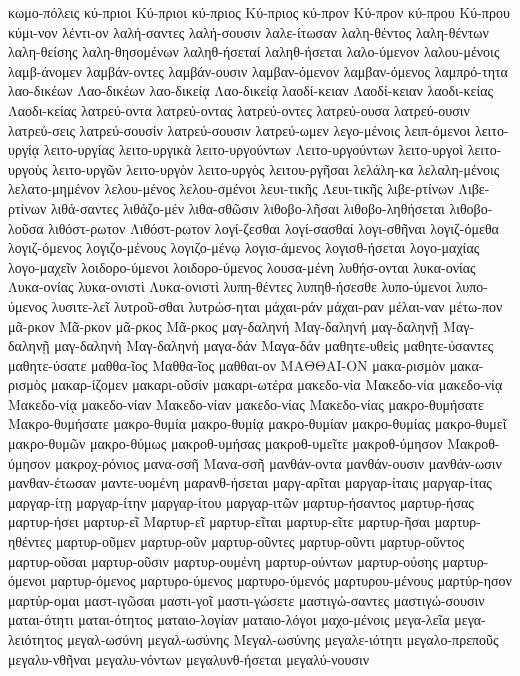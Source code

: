 {κωμο-πόλεις
κύ-πριοι
Κύ-πριοι
κύ-πριος
Κύ-πριος
κύ-προν
Κύ-προν
κύ-πρου
Κύ-πρου
κύμι-νον
λέντι-ον
λαλή-σαντες
λαλή-σουσιν
λαλε-ίτωσαν
λαλη-θέντος
λαλη-θέντων
λαλη-θείσης
λαλη-θησομένων
λαληθ-ήσεταί
λαληθ-ήσεται
λαλο-ύμενον
λαλου-μένοις
λαμβ-άνομεν
λαμβάν-οντες
λαμβάν-ουσιν
λαμβαν-όμενον
λαμβαν-όμενος
λαμπρό-τητα
λαο-δικέων
Λαο-δικέων
λαο-δικείᾳ
Λαο-δικείᾳ
λαοδί-κειαν
Λαοδί-κειαν
λαοδι-κείας
Λαοδι-κείας
λατρεύ-οντα
λατρεύ-οντας
λατρεύ-οντες
λατρεύ-ουσα
λατρεύ-ουσιν
λατρεύ-σεις
λατρεύ-σουσίν
λατρεύ-σουσιν
λατρεύ-ωμεν
λεγο-μένοις
λειπ-όμενοι
λειτο-υργίᾳ
λειτο-υργίας
λειτο-υργικὰ
λειτο-υργούντων
Λειτο-υργούντων
λειτο-υργοὶ
λειτο-υργοὺς
λειτο-υργῶν
λειτο-υργὸν
λειτο-υργὸς
λειτου-ργῆσαι
λελάλη-κα
λελαλη-μένοις
λελατο-μημένον
λελου-μένος
λελου-σμένοι
λευι-τικῆς
Λευι-τικῆς
λιβε-ρτίνων
Λιβε-ρτίνων
λιθά-σαντες
λιθάζο-μέν
λιθα-σθῶσιν
λιθοβο-λῆσαι
λιθοβο-ληθήσεται
λιθοβο-λοῦσα
λιθόστ-ρωτον
Λιθόστ-ρωτον
λογί-ζεσθαι
λογί-σασθαί
λογι-σθῆναι
λογιζ-όμεθα
λογιζ-όμενος
λογιζο-μένους
λογιζο-μένῳ
λογισ-άμενος
λογισθ-ήσεται
λογο-μαχίας
λογο-μαχεῖν
λοιδορο-ύμενοι
λοιδορο-ύμενος
λουσα-μένη
λυθήσ-ονται
λυκα-ονίας
Λυκα-ονίας
λυκα-ονιστὶ
Λυκα-ονιστὶ
λυπη-θέντες
λυπηθ-ήσεσθε
λυπο-ύμενοι
λυπο-ύμενος
λυσιτε-λεῖ
λυτροῦ-σθαι
λυτρώσ-ηται
μάχαι-ράν
μάχαι-ραν
μέλαι-ναν
μέτω-πον
μᾶ-ρκον
Μᾶ-ρκον
μᾶ-ρκος
Μᾶ-ρκος
μαγ-δαληνή
Μαγ-δαληνή
μαγ-δαληνῇ
Μαγ-δαληνῇ
μαγ-δαληνὴ
Μαγ-δαληνὴ
μαγα-δάν
Μαγα-δάν
μαθητε-υθεὶς
μαθητε-ύσαντες
μαθητε-ύσατε
μαθθα-ῖος
Μαθθα-ῖος
μαθθαι-ον
ΜΑΘΘΑΙ-ΟΝ
μακα-ρισμὸν
μακα-ρισμὸς
μακαρ-ίζομεν
μακαρι-οῦσίν
μακαρι-ωτέρα
μακεδο-νία
Μακεδο-νία
μακεδο-νίᾳ
Μακεδο-νίᾳ
μακεδο-νίαν
Μακεδο-νίαν
μακεδο-νίας
Μακεδο-νίας
μακρο-θυμήσατε
Μακρο-θυμήσατε
μακρο-θυμία
μακρο-θυμίᾳ
μακρο-θυμίαν
μακρο-θυμίας
μακρο-θυμεῖ
μακρο-θυμῶν
μακρο-θύμως
μακροθ-υμήσας
μακροθ-υμεῖτε
μακροθ-ύμησον
Μακροθ-ύμησον
μακροχ-ρόνιος
μανα-σσῆ
Μανα-σσῆ
μανθάν-οντα
μανθάν-ουσιν
μανθάν-ωσιν
μανθαν-έτωσαν
μαντε-υομένη
μαρανθ-ήσεται
μαργ-αρῖται
μαργαρ-ίταις
μαργαρ-ίτας
μαργαρ-ίτῃ
μαργαρ-ίτην
μαργαρ-ίτου
μαργαρ-ιτῶν
μαρτυρ-ήσαντος
μαρτυρ-ήσας
μαρτυρ-ήσει
μαρτυρ-εῖ
Μαρτυρ-εῖ
μαρτυρ-εῖται
μαρτυρ-εῖτε
μαρτυρ-ῆσαι
μαρτυρ-ηθέντες
μαρτυρ-οῦμεν
μαρτυρ-οῦν
μαρτυρ-οῦντες
μαρτυρ-οῦντι
μαρτυρ-οῦντος
μαρτυρ-οῦσαι
μαρτυρ-οῦσιν
μαρτυρ-ουμένη
μαρτυρ-ούντων
μαρτυρ-ούσης
μαρτυρ-όμενοι
μαρτυρ-όμενος
μαρτυρο-ύμενος
μαρτυρο-ύμενός
μαρτυρου-μένους
μαρτύρ-ησον
μαρτύρ-ομαι
μαστ-ιγῶσαι
μαστι-γοῖ
μαστι-γώσετε
μαστιγώ-σαντες
μαστιγώ-σουσιν
μαται-ότητι
μαται-ότητος
ματαιο-λογίαν
ματαιο-λόγοι
μαχο-μένοις
μεγα-λεῖα
μεγα-λειότητος
μεγαλ-ωσύνη
μεγαλ-ωσύνης
Μεγαλ-ωσύνης
μεγαλε-ιότητι
μεγαλο-πρεποῦς
μεγαλυ-νθῆναι
μεγαλυ-νόντων
μεγαλυνθ-ήσεται
μεγαλύ-νουσιν
}
